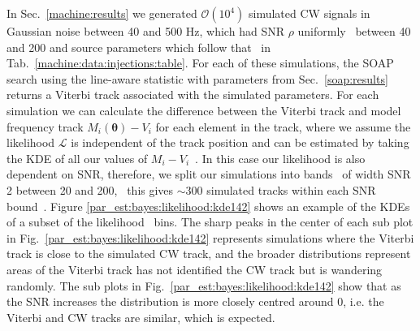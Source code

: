 In Sec.~\ref{machine:results} we generated $\mathcal{O}(10^{4})$ simulated
\gls{CW} signals in Gaussian noise between 40 and 500 Hz, which had \gls{SNR}
$\rho$ uniformly~ between 40 and 200 and
source parameters which follow that~ in
Tab.~\ref{machine:data:injections:table}. For each of these simulations, the
SOAP search using the line-aware statistic with parameters from
Sec.~\ref{soap:results} returns a Viterbi track associated with the simulated
parameters.  For each simulation we can calculate the difference between the
Viterbi track and model frequency track $M_i(\bm{\theta}) - V_i$ for each
element in the track, where we assume the likelihood $\mathcal{L}$ is
independent of the track position and can be estimated by taking the \gls{KDE}
of all our values of $M_i - V_i$~.  In this case our likelihood is also dependent on \gls{SNR},
therefore, we split our simulations into bands~ of width \gls{SNR}
2 between 20 and 200,~ this gives $\sim 300$
simulated tracks within each \gls{SNR} bound~.  Figure
\ref{par_est:bayes:likelihood:kde142} shows an example of the \glspl{KDE} of a
subset of the likelihood~ bins. The sharp peaks in the center of
each sub plot in Fig.~\ref{par_est:bayes:likelihood:kde142} represents
simulations where the Viterbi track is close to the simulated \gls{CW} track,
and the broader distributions represent areas of the Viterbi track has not
identified the \gls{CW} track but is wandering randomly.  The sub plots in
Fig.~\ref{par_est:bayes:likelihood:kde142} show that as the \gls{SNR} increases
the distribution is more closely centred around 0, i.e. the Viterbi and
\gls{CW} tracks are similar, which is expected.~
%
